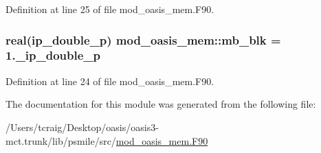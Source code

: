 Definition at line 25 of file mod\+\_\+oasis\+\_\+mem.\+F90.

\hypertarget{classmod__oasis__mem_a7c262f1c120ed57d527ee3de91552ee9}{
\subsubsection[{mb\+\_\+blk}]{\setlength{\rightskip}{0pt plus 5cm}real(ip\+\_\+double\+\_\+p) mod\+\_\+oasis\+\_\+mem\+::mb\+\_\+blk = 1.\+\_\+ip\+\_\+double\+\_\+p\hspace{0.3cm}{\ttfamily [private]}}}\label{classmod__oasis__mem_a7c262f1c120ed57d527ee3de91552ee9}


Definition at line 24 of file mod\+\_\+oasis\+\_\+mem.\+F90.



The documentation for this module was generated from the following file\+:\begin{DoxyCompactItemize}
\item 
/\+Users/tcraig/\+Desktop/oasis/oasis3-\/mct.\+trunk/lib/psmile/src/\hyperlink{mod__oasis__mem_8_f90}{mod\+\_\+oasis\+\_\+mem.\+F90}\end{DoxyCompactItemize}
